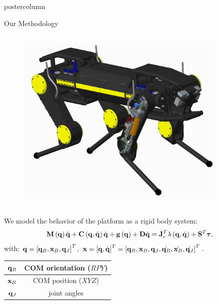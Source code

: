 \documentclass{beamer}
\begin{document}
\begin{frame}
\begin{columns}
\begin{column}{.29\textwidth}
\begin{beamercolorbox}[center]{postercolumn}
\begin{minipage}{.98\textwidth}
{\begin{myblock}{Our Methodology}
\begin{columns}
 \begin{figure}
  \centering
  \includegraphics[width=0.9\textwidth]{hyq2max_cad.jpg}
 \end{figure}
\end{columns}
\vspace*{5mm}
We model the behavior of the platform as a rigid body system:
\begin{equation}
\mathbf{M} \left( \mathbf{q} \right) \ddot{\mathbf{q}} + \mathbf{C} \left( \mathbf{q}, \dot{\mathbf{q}} \right) \dot{\mathbf{q}}+ 
\mathbf{g} \left( \mathbf{q} \right) + \mathbf{D} \dot{\mathbf{q}} = \mathbf{J}^T_{c} \lambda \left( \mathbf{q}, 
\dot{\mathbf{q}} \right) + \mathbf{S}^{T} \boldsymbol{\tau},
\label{eq_motion_general}
\end{equation}
\noindent 
with: $\mathbf{q} = \left[\mathbf{q}_{B}, \mathbf{x}_{B}, \mathbf{q}_{J} \right]^{T}$,
$ \mathbf{x} = \left[  \mathbf{q} ,   \dot{\mathbf{q}} \right] ^{T} =
 \left[ \mathbf{q}_{B}, \mathbf{x}_{B}, \mathbf{q}_{J}, \dot{\mathbf{q}_{B}}, 
\dot{\mathbf{x}_{B}}, \dot{\mathbf{q}_{J}} \right] ^{T}$.
% 
\vspace*{2mm}
\begin{center}
 \begin{tabular}{c | c} 
 $\mathbf{q}_{B}$ & COM orientation ($RPY$)\\  
 \hline
 $\mathbf{x}_{B}$ & COM position ($XYZ$)\\ 
 \hline
 $\mathbf{q}_{J}$ & joint angles \\
\end{tabular}
\end{center}


\end{myblock}}
\end{minipage}
\end{beamercolorbox}
\end{column}
\end{columns}
\end{frame}
\end{document}
